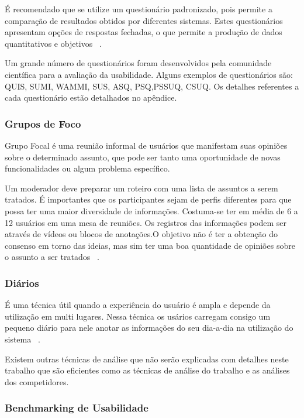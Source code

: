 	É recomendado que se utilize um questionário padronizado, pois permite a comparação de resultados obtidos por diferentes sistemas. Estes questionários apresentam opções de respostas fechadas, o que permite a produção de dados quantitativos e objetivos ~\cite{cybis2010}.

	Um grande número de questionários foram desenvolvidos pela comunidade científica para a avaliação da usabilidade.  Alguns exemplos de questionários são: QUIS, SUMI,  WAMMI, SUS, ASQ, PSQ,PSSUQ, CSUQ. Os detalhes referentes a cada questionário estão detalhados no apêndice.

\subsubsection{Grupos de Foco}

	Grupo Focal é uma reunião informal de usuários que manifestam suas opiniões sobre o determinado assunto, que pode ser tanto uma oportunidade de novas funcionalidades ou algum problema específico.

	Um moderador deve preparar um roteiro  com uma lista de assuntos a serem tratados. É importantes que os participantes sejam de perfis diferentes para que possa ter uma maior diversidade de informações. Costuma-se ter em média de 6 a 12 usuários em uma mesa de reuniões. Os registros das informações podem ser através de vídeos ou blocos de anotações.O objetivo não é ter a obtenção do consenso em torno das ideias, mas sim ter uma boa quantidade de opiniões sobre o assunto a ser tratados ~\cite{cybis2010}.


\subsubsection{Diários}

	É uma técnica útil quando a experiência do usuário é ampla e depende da utilização em multi lugares. Nessa técnica os usários carregam consigo um pequeno diário para nele anotar as informações do seu dia-a-dia na utilização do sistema ~\cite{cybis2010}.

	Existem outras técnicas de análise que não serão explicadas com detalhes neste trabalho que são eficientes como as técnicas de análise do trabalho e as análises dos competidores.

\subsubsection{Benchmarking de Usabilidade}

